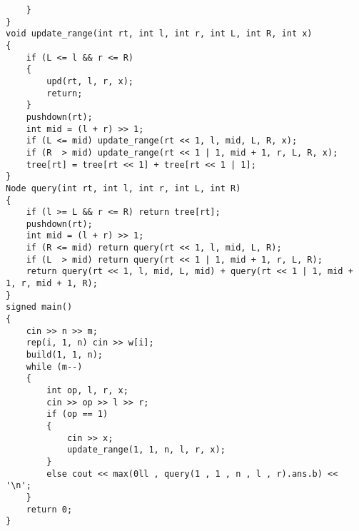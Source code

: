 \documentclass[E:/GsjzTle/main/main.tex]{subfiles}
\begin{document}
\begin{lstlisting}
	}
}
void update_range(int rt, int l, int r, int L, int R, int x)
{
	if (L <= l && r <= R)
	{
		upd(rt, l, r, x);
		return;
	}
	pushdown(rt);
	int mid = (l + r) >> 1;
	if (L <= mid) update_range(rt << 1, l, mid, L, R, x);
	if (R  > mid) update_range(rt << 1 | 1, mid + 1, r, L, R, x);
	tree[rt] = tree[rt << 1] + tree[rt << 1 | 1];
}
Node query(int rt, int l, int r, int L, int R)
{
	if (l >= L && r <= R) return tree[rt];
	pushdown(rt);
	int mid = (l + r) >> 1;
	if (R <= mid) return query(rt << 1, l, mid, L, R);
	if (L  > mid) return query(rt << 1 | 1, mid + 1, r, L, R);
	return query(rt << 1, l, mid, L, mid) + query(rt << 1 | 1, mid + 1, r, mid + 1, R);
}
signed main()
{
	cin >> n >> m;
	rep(i, 1, n) cin >> w[i];
	build(1, 1, n);
	while (m--)
	{
		int op, l, r, x;
		cin >> op >> l >> r;
		if (op == 1)
		{
			cin >> x;
			update_range(1, 1, n, l, r, x);
		}
		else cout << max(0ll , query(1 , 1 , n , l , r).ans.b) << '\n';
	}
	return 0;
}
\end{lstlisting}
\end{document}
